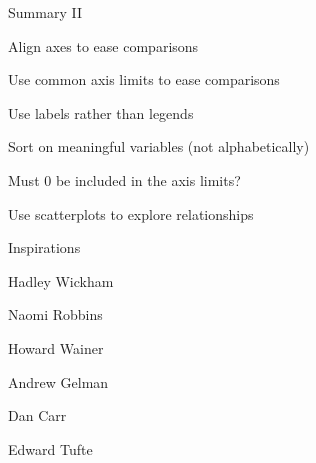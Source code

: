 \documentclass[aspectratio=169,12pt,t]{beamer}
\begin{document}
\begin{frame}{Summary II}

\bbi
\item Align axes to ease comparisons

\item Use common axis limits to ease comparisons

\item Use labels rather than legends

\item Sort on meaningful variables (not alphabetically)

\item Must 0 be included in the axis limits?

\item Use scatterplots to explore relationships
\ei

\note{
}
\end{frame}





\begin{frame}{Inspirations}


\bbi
\item Hadley Wickham

\item Naomi Robbins

\item Howard Wainer

\item Andrew Gelman

\item Dan Carr

\item Edward Tufte
  \ei


  \note{
  }
\end{frame}
\end{document}
